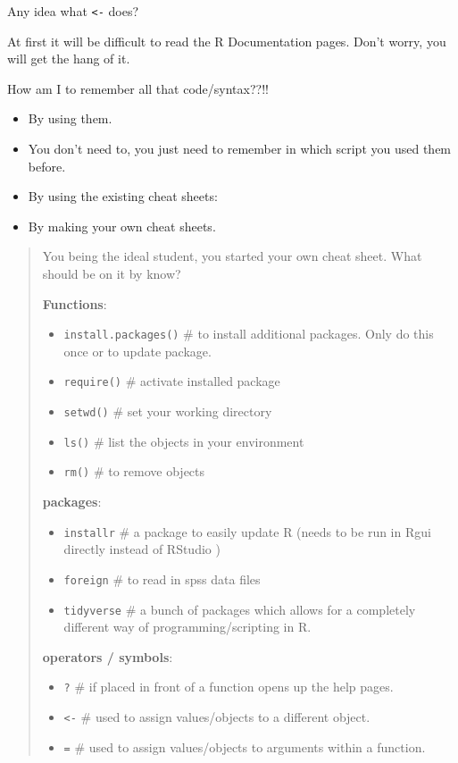 \documentclass[
]{book}
\providecommand{\tightlist}{%
  \setlength{\itemsep}{0pt}\setlength{\parskip}{0pt}}
\begin{document}
Any idea what \texttt{\textless{}-} does?

At first it will be difficult to read the R Documentation pages. Don't worry, you will get the hang of it.

How am I to remember all that code/syntax??!!

\begin{itemize}
\tightlist
\item
  By using them.
\item
  You don't need to, you just need to remember in which script you used them before.
\item
  By using the existing cheat sheets:
\item
  By making your own cheat sheets.
\end{itemize}

\begin{quote}
You being the ideal student, you started your own cheat sheet. What should be on it by know?

\textbf{Functions}:

\begin{itemize}
\tightlist
\item
  \texttt{install.packages()} \# to install additional packages. Only do this once or to update package.
\item
  \texttt{require()} \# activate installed package
\item
  \texttt{setwd()} \# set your working directory
\item
  \texttt{ls()} \# list the objects in your environment
\item
  \texttt{rm()} \# to remove objects
\end{itemize}

\textbf{packages}:

\begin{itemize}
\tightlist
\item
  \texttt{installr} \# a package to easily update R (needs to be run in Rgui directly instead of RStudio )
\item
  \texttt{foreign} \# to read in spss data files
\item
  \texttt{tidyverse} \# a bunch of packages which allows for a completely different way of programming/scripting in R.\\
\end{itemize}

\textbf{operators / symbols}:

\begin{itemize}
\tightlist
\item
  \texttt{?} \# if placed in front of a function opens up the help pages.
\item
  \texttt{\textless{}-} \# used to assign values/objects to a different object.
\item
  \texttt{=} \# used to assign values/objects to arguments within a function.
\end{itemize}
\end{quote}
\end{document}
